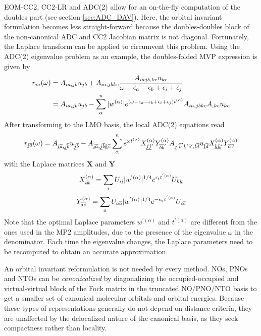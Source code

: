EOM-CC2, CC2-LR and ADC(2) allow for an on-the-fly computation of the doubles part (see section \ref{sec:ADC_DAV}). Here, the orbital invariant formulation becomes less straight-forward because the doubles-doubles block of the non-canonical ADC and CC2 Jacobian matrix is not diagonal. Fortunately, the Laplace transform can be applied to circumvent this problem. Using the ADC(2) eigenvalue problem as an example, the doubles-folded MVP expression is given by
\begin{equation}
\begin{split}
r_{ia}(\omega) &= A_{ia,jb} u_{jb} + A_{ia,jbkc} \frac{A_{iajb,kc} u_{kc}}{\omega - \epsilon_a - \epsilon_b + \epsilon_i + \epsilon_j} \\
&= A_{ia,jb} u_{jb} - \sum_{\alpha}^{n} |w^{(\alpha)}| e^{\left(\omega - \epsilon_a - \epsilon_b + \epsilon_i + \epsilon_j\right) t^{(\alpha)}} A_{ia,jbkc} A_{,kc} u_{kc} 
\end{split}
\end{equation}
After transforming to the LMO basis, the local ADC(2) equations read
\begin{equation}
r_{\underline{i} \overline{a}}(\omega) = A_{\underline{i} \overline{a}, \underline{j} \overline{b}} u_{\underline{j} \overline{b}} - A_{\underline{i} \overline{a}, \underline{j} \overline{b} \underline{k} \overline{c}} \sum_{\alpha}^{n} e^{\omega t^{(\alpha)}} X_{\underline{j} \underline{j}'}^{(\alpha)} Y_{\overline{b} \overline{b}'}^{(\alpha)} A_{\underline{j}' \overline{b}' \underline{k}' \overline{c}', \underline{l} \overline{d}} u_{\underline{l} \overline{d}} X_{\underline{k} \underline{k}'}^{(\alpha)} Y_{\overline{c} \overline{c}'}^{(\alpha)}  \\
\end{equation}
\noindent with the Laplace matrices $\mathbf{X}$ and $\mathbf{Y}$ 
\begin{equation}
X_{\underline{i}\underline{k}}^{(\alpha)} = \sum_i U_{i\underline{i}} |w^{'(\alpha)}|^{1/4} e^{\epsilon_i t^{'(\alpha)}} U_{k\underline{k}}
\end{equation}
\begin{equation}
Y_{\overline{a}\overline{c}}^{(\alpha)} = \sum_a U_{a\overline{a}} |w^{'(\alpha)}|^{1/4} e^{-\epsilon_a t^{'(\alpha)}} U_{c\overline{c}}
\end{equation}
\noindent Note that the optimal Laplace parameters $w^{'(\alpha)}$ and $t^{'(\alpha)}$ are different from the ones used in the MP2 amplitudes, due to the presence of the eigenvalue $\omega$ in the denominator. Each time the eigenvalue changes, the Laplace parameters need to be recomputed to obtain an accurate approximation. 

An orbital invariant reformulation is not needed by every method. NOs, PNOs and NTOs can be \emph{canonicalized} by diagonalizing the occupied-occupied and virtual-virtual block of the Fock matrix in the truncated NO/PNO/NTO basis to get a smaller set of canonical molecular orbitals and orbital energies. Because these types of representations generally do not depend on distance criteria, they are unaffected by the delocalized nature of the canonical basis, as they seek compactness rather than locality. 

